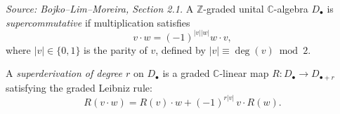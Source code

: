 \begin{definition}[SuperCommAlgebra]
  \label{def:supercommutative-algebra}
  \textit{Source: Bojko--Lim--Moreira, Section 2.1.}
  A \(\mathbb{Z}\)-graded unital \(\mathbb{C}\)-algebra \(D_\bullet\) is \emph{supercommutative}
  if multiplication satisfies
  \[v \cdot w = (-1)^{|v||w|} w \cdot v,\]
  where \(|v| \in \{0,1\}\) is the parity of \(v\), defined by \(|v| \equiv \deg(v) \bmod 2\).

  A \emph{superderivation of degree \(r\)} on \(D_\bullet\) is a graded \(\mathbb{C}\)-linear map
  \(R \colon D_\bullet \to D_{\bullet+r}\) satisfying the graded Leibniz rule:
  \[R(v \cdot w) = R(v) \cdot w + (-1)^{r|v|}\, v \cdot R(w).\]
\end{definition}


